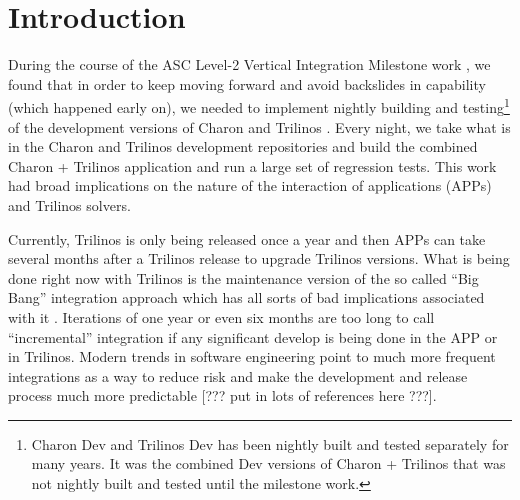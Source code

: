 \documentclass[pdf,ps2pdf,11pt]{SANDreport}
\begin{document}




%


\SANDmain %


%
\section{Introduction}
%

During the course of the ASC Level-2 Vertical Integration Milestone work
{}\cite{ref:asc-vertical-integration-milestone}, we found that in order to
keep moving forward and avoid backslides in capability (which happened early
on), we needed to implement nightly building and testing\footnote{Charon Dev
and Trilinos Dev has been nightly built and tested separately for many years.
It was the combined Dev versions of Charon + Trilinos that was not nightly
built and tested until the milestone work.} of the development versions of
Charon and Trilinos {}\cite{ref:trilinos}.  Every night, we take what is in
the Charon and Trilinos development repositories and build the combined Charon
+ Trilinos application and run a large set of regression tests.  This work had
broad implications on the nature of the interaction of applications (APPs) and
Trilinos solvers.

Currently, Trilinos is only being released once a year and then APPs can take
several months after a Trilinos release to upgrade Trilinos versions.  What is
being done right now with Trilinos is the maintenance version of the so called
``Big Bang'' integration approach which has all sorts of bad implications
associated with it {}\cite{book:code-complete-2}.  Iterations of one year or
even six months are too long to call ``incremental'' integration if any
significant develop is being done in the APP or in Trilinos.  Modern trends in
software engineering point to much more frequent integrations as a way to
reduce risk and make the development and release process much more predictable
[??? put in lots of references here ???].
\end{document}
